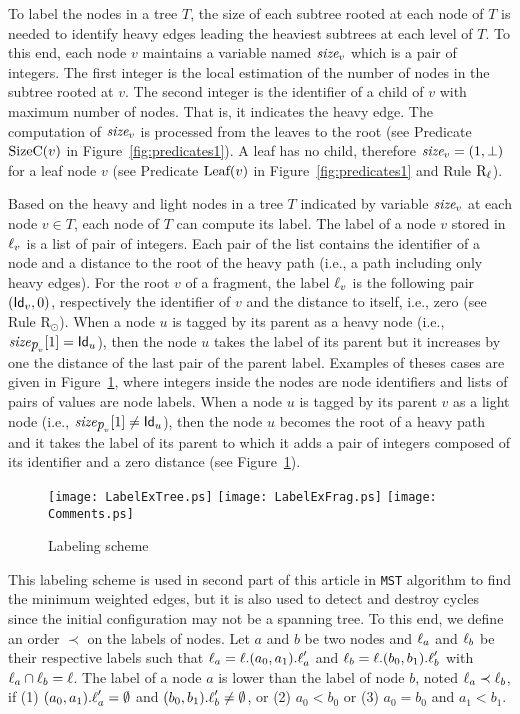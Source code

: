 \documentclass[11pt,a4paper]{article}
\newcommand{\id}{\mbox{\sf Id}}
\newcommand{\parent}{\mbox{\it p}}
\newcommand{\lab}{\mbox{\rm $\ell$}}
\newcommand{\TS}{\mbox{\it size}}
\newcommand{\SizeC}{\mbox{\rm SizeC}}
\newcommand{\Isleaf}{\mbox{\rm Leaf}}
\newcommand{\RRoot}{\mbox{\rm R$_{\odot}$}} 	\newcommand{\RRLC}{\mbox{\rm R$_{\ell_{\odot}}$}}\newcommand{\RLC}{\mbox{\rm R$_{\ell}$}} \newcommand{\RMin}{\mbox{\rm R$_{Min}$}}
\newcommand{\MST}{\mbox{\tt MST}}
\begin{document}
To label the nodes in a tree $T$, the size of each subtree rooted at each node of $T$ is needed to identify heavy edges leading the heaviest subtrees at each level of $T$.
To this end, each node $v$ maintains 
a variable named $\TS_v$ which is a pair of integers. 
The first integer is the local 
estimation of the number of nodes in the subtree rooted at $v$. 
The second integer is the identifier of a child of $v$ with 
maximum number of nodes.  That is, it indicates the heavy edge.
The computation of $\TS_v$ is processed from the leaves to the root 
(see  Predicate $\SizeC(v)$ in Figure~\ref{fig:predicates1}).
A leaf has no child, therefore $\TS_v=(1,\bot)$ for a leaf node $v$ (see Predicate $\Isleaf(v)$ in 
Figure~\ref{fig:predicates1} and Rule $\RLC$).


Based on the heavy and light nodes in a tree $T$ indicated by variable $\TS_v$ at each node $v \in T$, each node of $T$ can compute its label.
The label of a node $v$ stored in $\lab_v$ is a list of pair of integers.
Each pair of the list contains the identifier of a node and a distance to the root of the heavy path (i.e., a path including only heavy edges).
For the root $v$ of a fragment, the label $\lab_v$ is the following pair $(\id_v,0)$, respectively the identifier of $v$ and the distance to itself, i.e., zero (see Rule \RRoot\/).
When a node $u$ is tagged by its parent as a heavy node (i.e., $\TS_{\parent_v}[1]=\id_u$), then the node $u$ takes the label of its parent but 
it increases by one the distance of the last pair of the parent label.
Examples of theses cases are given in Figure~\ref{fig:label}, where integers inside the nodes are node identifiers and lists of pairs of values are node labels.
When a node $u$ is tagged by its parent $v$ as a light node (i.e., $\TS_{\parent_v}[1] \neq \id_u$), then the node $u$ becomes the root of a heavy path and it takes the label of its parent to which it adds a pair of integers composed of its identifier and a zero distance (see Figure~\ref{fig:label}). 

\begin{figure}[htbp]
\begin{center}
\texttt{[image: LabelExTree.ps]}
\texttt{[image: LabelExFrag.ps]}
\texttt{[image: Comments.ps]}
\caption{Labeling scheme}
\label{fig:label}
\end{center}
\end{figure}
This labeling scheme is used in second part of this article in  \MST\/ algorithm to find the minimum weighted edges, but it is also used to detect and destroy cycles since the initial configuration may not be a spanning tree. To this end, we define an order $\prec$ on the 
labels of nodes. 
Let $a$ and $b$ be two nodes and 
$\lab_a$ and $\lab_b$ be their respective labels 
such that $\lab_a=\lab .(a_0,a_1).\lab_a'$ and $\lab_b=\lab.(b_0,b_1).\lab_b'$ 
with $\lab_a \cap \lab_b=\lab$. The label of a node $a$ is lower than the label of node $b$, noted $\lab_a \prec \lab_b$, if (1) $(a_0,a_1).\lab_a'=\emptyset$ and $(b_0,b_1).\lab_b'\neq \emptyset$, or (2) $a_0<b_0$ or (3) $a_0=b_0$ and $a_1<b_1$.\\
\end{document}
